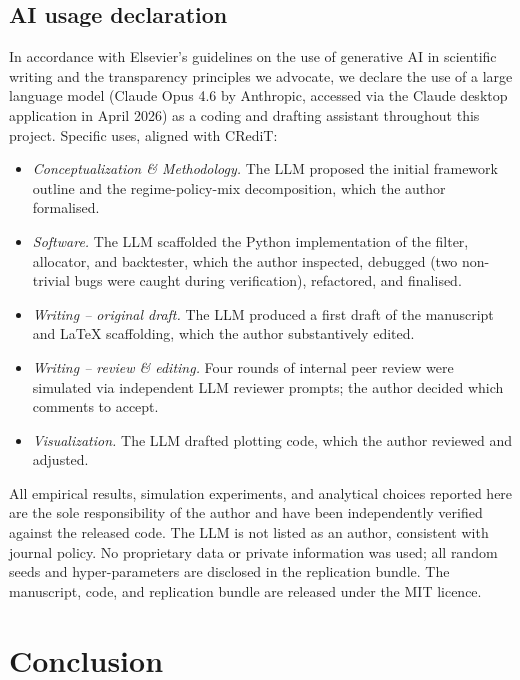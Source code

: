 \documentclass[review,12pt,authoryear]{elsarticle}
\begin{document}
\subsection{AI usage declaration}
\label{sec:ai-usage}
In accordance with Elsevier's guidelines on the use of generative AI in scientific writing
and the transparency principles we advocate, we declare the use of a large language model
(Claude Opus 4.6 by Anthropic, accessed via the Claude desktop application in April 2026)
as a coding and drafting assistant throughout this project. Specific uses, aligned with
CRediT:
\begin{itemize}
    \item \emph{Conceptualization \& Methodology.} The LLM proposed the initial framework
    outline and the regime-policy-mix decomposition, which the author formalised.
    \item \emph{Software.} The LLM scaffolded the Python implementation of the filter,
    allocator, and backtester, which the author inspected, debugged (two non-trivial bugs
    were caught during verification), refactored, and finalised.
    \item \emph{Writing – original draft.} The LLM produced a first draft of the manuscript
    and LaTeX scaffolding, which the author substantively edited.
    \item \emph{Writing – review \& editing.} Four rounds of internal peer review were
    simulated via independent LLM reviewer prompts; the author decided which comments to
    accept.
    \item \emph{Visualization.} The LLM drafted plotting code, which the author reviewed and
    adjusted.
\end{itemize}
All empirical results, simulation experiments, and analytical choices reported here are the
sole responsibility of the author and have been independently verified against the released
code. The LLM is not listed as an author, consistent with journal policy. No proprietary
data or private information was used; all random seeds and hyper-parameters are disclosed in
the replication bundle. The manuscript, code, and replication bundle are released under the
MIT licence.

\section{Conclusion}
\label{sec:conclusion}
\end{document}
